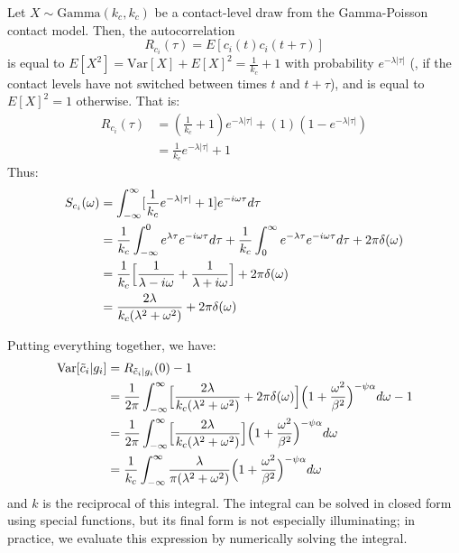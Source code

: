  Let $X \sim \text{Gamma}(k_c, k_c)$ be a contact-level draw from the Gamma-Poisson contact model. Then, the autocorrelation 
\begin{equation}
	R_{c_i}(\tau) = E[c_i(t) c_i(t + \tau)]
\end{equation}
is equal to $E[X^2] = \text{Var}[X] + E[X]^2 = \frac{1}{k_c} + 1$ with probability $e^{-\lambda |\tau|}$ (\ie, if the contact levels have not switched between times $t$ and $t + \tau$), and is equal to $E[X]^2 = 1$ otherwise. That is: 
\begin{align}
	R_{c_i}(\tau) &= (\frac{1}{k_c} +1) e^{-\lambda |\tau|} + (1)(1 - e^{-\lambda |\tau|}) \\ 
	&= \frac{1}{k_c} e^{-\lambda |\tau|} + 1
\end{align}
Thus: 
\begin{align}
S_{c_i}(\omega) &= \int_{-\infty}^{\infty} [\frac{1}{k_c}e^{-\lambda |\tau| } + 1] e^{-i \omega \tau} d\tau \\ 
&= \frac{1}{k_c} \int_{-\infty}^{0} e^{ \lambda \tau} e^{- i \omega \tau} d\tau + 
\frac{1}{k_c} \int_{0}^{\infty} e^{- \lambda \tau } e^{- i \omega \tau} d\tau + 2\pi \delta(\omega) \\ 
&= \frac{1}{k_c} \Bigl[ \frac{1}{\lambda - i \omega} + \frac{1}{\lambda + i \omega} \Bigr]  + 2\pi \delta(\omega) \\
&= \frac{2 \lambda}{k_c (\lambda^2 + \omega^2)} + 2\pi \delta(\omega) 
\end{align}

 Putting everything together, we have: 
\begin{align}
\text{Var}[\tilde{c}_i | g_i] &= R_{\tilde{c}_i | g_i}(0) - 1 \\
&= \frac{1}{2\pi} \int_{-\infty}^{\infty} 
\Bigl[\frac{2 \lambda}{k_c (\lambda^2 + \omega^2)} + 2\pi \delta(\omega)\Bigr]
\Bigl( 1 + \frac{\omega^2}{\beta^2}\Bigr )^{-\psi \alpha} d\omega - 1 \\
&= \frac{1}{2\pi} \int_{-\infty}^{\infty} 
\Bigl[\frac{2 \lambda}{k_c (\lambda^2 + \omega^2)} \Bigr] \Bigl( 1 + \frac{\omega^2}{\beta^2}\Bigr )^{-\psi \alpha} d\omega \\
&= \frac{1}{k_c}\int_{-\infty}^{\infty} \frac{\lambda}{\pi (\lambda^2 + \omega^2)} \Bigl( 1 + \frac{\omega^2}{\beta^2}\Bigr )^{-\psi \alpha} d\omega
\end{align}
and $k$ is the reciprocal of this integral. The integral can be solved in closed form using special functions, but its final form is not especially illuminating; in practice, we evaluate this expression by numerically solving the integral. 

